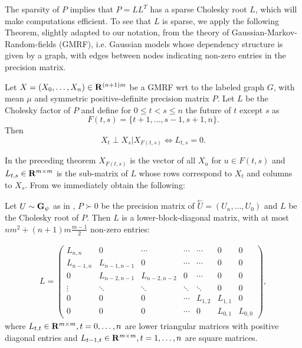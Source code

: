 The sparsity of $P$ implies that $P = LL^{T}$ has a sparse Cholesky root $L$, which will make computations efficient. 
To see that $L$ is sparse, we apply the following Theorem, slightly adapted to our notation, from the theory of Gaussian-Markov-Random-fields (GMRF), i.e. Gaussian models whose dependency structure is given by a graph, with edges between nodes indicating non-zero entries in the precision matrix.
\begin{theorem} 
    \label{thm:gelfand_gmrf}
    Let $X = (X_{0}, \dots, X_{n}) \in \mathbf R^{(n + 1)m}$ be a GMRF wrt to the labeled graph $G$, with mean $\mu$ and symmetric positive-definite precision matrix $P$. Let $L$ be the Cholesky factor of $P$ and define for $0 \leq t < s \leq n$ the future of $t$ except $s$ as 
    $$
        F(t,s) = \{t + 1, \dots, s - 1, s+ 1, n\}.
    $$
    Then
    $$
        X_{t} \perp X_{s} | X_{F(t,s)} \Leftrightarrow L_{t,s} = 0.
    $$
\end{theorem}
In the preceding theorem $X_{F(t,s)}$ is the vector of all $X_{u}$ for $u\in F(t,s)$ and $L_{t,s} \in \mathbf R^{m\times m}$ is the sub-matrix of $L$  whose rows correspond to $X_{t}$ and columns to $X_{s}$. 
From  we immediately obtain the following:

\begin{corollary}
    \label{cor:sparsity_L}
    Let $U \sim \mathbf G_{\psi}$ as in , $P \succ 0$ be the precision matrix of $\overset{\leftarrow}{U} = \left( U_{n}, \dots, U_{0} \right)$ and $L$ be the Cholesky root of $P$. 
    Then $L$ is a lower-block-diagonal matrix, with at most $nm^{2} + (n + 1)m\frac{m - 1}{2}$ non-zero entries:
    
    \begin{align}
        \label{eq:L_structure}
    L = \begin{pmatrix}
        L_{n,n} & 0 & \cdots & \cdots & \cdots & 0 & 0 \\
        L_{n-1, n} & L_{n-1,n-1} & 0 & \cdots & \cdots & 0 & 0\\
        0 & L_{n-2,n-1} & L_{n-2,n-2} & 0 & \cdots & 0 & 0 \\
        \vdots & \ddots & \ddots  & \ddots & \ddots & 0 & 0 \\
        0 & 0& 0& \cdots& L_{1, 2}& L_{1, 1} & 0 \\
        0 & 0 & 0 & \cdots & 0 & L_{0, 1} & L_{0,0} 
    \end{pmatrix},
    \end{align}
    where $L_{t,t} \in \mathbf R^{m\times m}, t = 0, \dots, n$ are lower triangular matrices with positive diagonal entries and $L_{t-1,t}\in\mathbf R^{m \times m}, t = 1, \dots, n$ are square matrices.
\end{corollary}

